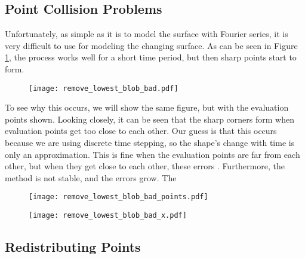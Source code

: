 \subsection*{Point Collision Problems}

Unfortunately, as simple as it is to model the surface with Fourier series, it is very difficult to use for modeling the changing surface. As can be seen in Figure \ref{fig:remove-lowest-blob-bad}, the process works well for a short time period, but then sharp points start to form.


\begin{figure}[H]
    \begin{center}
      \texttt{[image: remove\_lowest\_blob\_bad.pdf]}
    \end{center}
  \vspace{-.2in} %
  \caption{\label{fig:remove-lowest-blob-bad}}
\end{figure}

To see why this occurs, we will show the same figure, but with the evaluation points shown. Looking closely, it can be seen that the sharp corners form when evaluation points get too close to each other. Our guess is that this occurs because we are using discrete time stepping, so the shape's change with time is only an approximation. This is fine when the evaluation points are far from each other, but when they get close to each other, these errors . Furthermore, the method is not stable, and the errors grow. The 

\begin{figure}[H]
    \begin{center}
      \texttt{[image: remove\_lowest\_blob\_bad\_points.pdf]}
    \end{center}
  \vspace{-.2in} %
  \caption{\label{fig:remove-lowest-blog-bad-points}}
\end{figure}

\begin{figure}[H]
    \begin{center}
      \texttt{[image: remove\_lowest\_blob\_bad\_x.pdf]}
    \end{center}
  \vspace{-.2in} %
  \caption{\label{fig:remove-lowest-blob-bad-x}}
\end{figure}

\subsection*{Redistributing Points}


